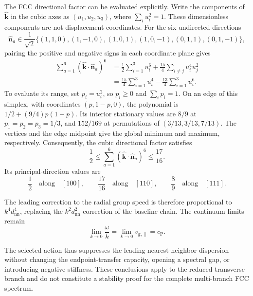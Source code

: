 The FCC directional factor can be evaluated explicitly. Write the components
of \(\widehat{\mathbf k}\) in the cubic axes as \((u_1,u_2,u_3)\), where
\(\sum_i u_i^2=1\). These dimensionless components are not displacement
coordinates. For the six undirected directions
\[
    \widehat{\mathbf n}_a\in\frac{1}{\sqrt2}
    \bigl\{(1,1,0),(1,-1,0),(1,0,1),(1,0,-1),(0,1,1),(0,1,-1)\bigr\},
\]
pairing the positive and negative signs in each coordinate plane gives
\[
\begin{aligned}
    \sum_{a=1}^{6}
       (\widehat{\mathbf k}\cdot\widehat{\mathbf n}_a)^6
    &=\frac12\sum_{i=1}^{3}u_i^6
      +\frac{15}{4}\sum_{i\neq j}u_i^4u_j^2\\
    &=\frac{15}{4}\sum_{i=1}^{3}u_i^4
      -\frac{13}{4}\sum_{i=1}^{3}u_i^6.
\end{aligned}
\]
To evaluate its range, set \(p_i=u_i^2\), so \(p_i\geq0\) and
\(\sum_i p_i=1\). On an edge of this simplex, with coordinates
\((p,1-p,0)\), the polynomial is
\(1/2+(9/4)p(1-p)\). Its interior stationary values are \(8/9\) at
\(p_1=p_2=p_3=1/3\), and \(152/169\) at permutations of
\((3/13,3/13,7/13)\). The vertices and the edge midpoint give the global
minimum and maximum, respectively. Consequently, the cubic directional
factor satisfies
\begin{equation}
    \frac{1}{2}
    \leq
    \sum_{a=1}^{6}
    \left(
        \widehat{\mathbf k}
        \cdot
        \widehat{\mathbf n}_a
    \right)^6
    \leq
    \frac{17}{16}.
    \label{eq:photon_relaxation_fcc_directional_bounds}
\end{equation}
Its principal-direction values are
\[
    \frac{1}{2}
    \quad\text{along}\quad
    [100],
    \qquad
    \frac{17}{16}
    \quad\text{along}\quad
    [110],
    \qquad
    \frac{8}{9}
    \quad\text{along}\quad
    [111].
\]

The leading correction to the radial group speed is therefore proportional to
\(k^4d_{\mathrm{nn}}^4\), replacing the
\(k^2d_{\mathrm{nn}}^2\) correction of the baseline chain. The continuum
limits remain
\begin{equation}
    \lim_{k\rightarrow0}
    \frac{
        \omega
    }{
        k
    }
    =
    \lim_{k\rightarrow0}
    v_{\mathrm{g},\parallel}
    =
    c_{\mathrm P}.
    \label{eq:photon_relaxation_suppressed_continuum_limit}
\end{equation}

The selected action thus suppresses the leading nearest-neighbor dispersion
without changing the endpoint-transfer capacity, opening a spectral gap, or
introducing negative stiffness. These conclusions apply to the reduced
transverse branch and do not constitute a stability proof for the complete
multi-branch FCC spectrum.

